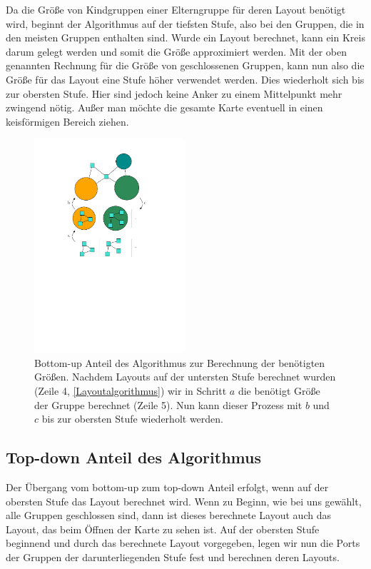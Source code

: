 Da die Größe von Kindgruppen einer Elterngruppe für deren Layout benötigt wird, beginnt der Algorithmus auf der tiefsten Stufe,
also bei den Gruppen, die in den meisten Gruppen enthalten sind. Wurde ein Layout berechnet, kann ein Kreis darum gelegt werden und somit die Größe approximiert werden.
Mit der oben genannten Rechnung für die Größe von geschlossenen Gruppen, kann nun also die Größe für das Layout eine Stufe höher verwendet werden.
Dies wiederholt sich bis zur obersten Stufe. Hier sind jedoch keine Anker zu einem Mittelpunkt mehr zwingend nötig. 
Außer man möchte die gesamte Karte eventuell in einen keisförmigen Bereich ziehen.

\begin{figure}[h!]
\begin{center} 
  \includegraphics[width=0.5\textwidth]{Pics/BottomUp2.pdf}
  \caption{Bottom-up Anteil des Algorithmus zur Berechnung der benötigten Größen.
  Nachdem Layouts auf der untersten Stufe berechnet wurden (Zeile 4, \autoref{Layoutalgorithmus}) wir in Schritt $a$ die benötigt Größe der Gruppe berechnet (Zeile 5). 
  Nun kann dieser Prozess mit $b$ und $c$ bis zur obersten Stufe wiederholt werden. }
  \label{f:BottomUp}
\end{center}
\end{figure}


\subsection{Top-down Anteil des Algorithmus}
Der Übergang vom bottom-up zum top-down Anteil erfolgt, wenn auf der obersten Stufe das Layout berechnet wird.
Wenn zu Beginn, wie bei uns gewählt, alle Gruppen geschlossen sind, dann ist dieses berechnete Layout auch das Layout, das beim Öffnen der Karte zu sehen ist.
Auf der obersten Stufe beginnend und durch das berechnete Layout vorgegeben, legen wir nun die Ports der Gruppen der darunterliegenden Stufe fest und berechnen deren Layouts.
		
